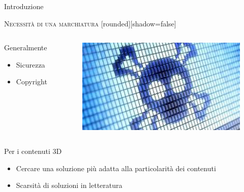 \documentclass{beamer}
\begin{document}
\begin{section}{Introduzione}
\begin{frame}[t]{\textsc{Necessit\`{a} di una marchiatura}}
[rounded][shadow=false]
\begin{columns}[T]
\begin{column}[T]{5cm}
\begin{center}
\begin{block}{Generalmente}
\begin{itemize}
\item  Sicurezza
\item  Copyright
\end{itemize}
\end{block}
\end{center}
\end{column}
\begin{column}[T]{5cm}
\begin{figure}
  \includegraphics[width=1\textwidth]{./img/download.jpg}
  \label{fig:rna_binding}
\end{figure}
\end{column}
\end{columns}
\begin{block}{Per i contenuti 3D}
\begin{itemize}
\item Cercare una soluzione pi\`{u} adatta alla particolarit\`{a} dei contenuti
\item Scarsit\`{a} di soluzioni in letteratura
\end{itemize}
\end{block}
\end{frame}




\end{section}
\end{document}
